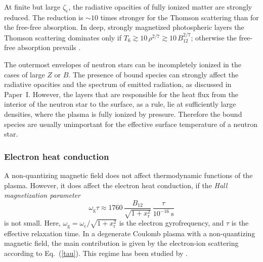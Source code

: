 \documentclass[smallextended]{svjour3}       %
\newcommand{\omc}{\omega_\mathrm{c}}
\newcommand{\omg}{\omega_\mathrm{g}}
\newcommand{\req}[1]{Eq.~(\ref{#1})}
\newcommand{\zete}{\zeta_e}
\begin{document}
At finite but large $\zete$, the radiative opacities of
fully ionized matter are strongly reduced. The reduction is
$\sim10$ times stronger for the Thomson scattering than for
the free-free absorption. In deep, strongly magnetized
photospheric layers the Thomson scattering dominates only if
$T_6\gtrsim10\,\rho^{2/7} \gtrsim 10\,B_{12}^{2/7}$;
otherwise the free-free absorption prevails \citep{PY01}.

The outermost envelopes of neutron stars can be incompletely
ionized in the cases of large $Z$ or $B$. The presence of
bound species can strongly affect the radiative opacities
and the spectrum of emitted radiation, as discussed in
Paper~I. However, the layers that are responsible for the
heat flux from the interior of the neutron star to the
surface, as a rule, lie at sufficiently large densities,
where the plasma is fully ionized by pressure. Therefore the
bound species are usually unimportant for the effective
surface temperature of a neutron star.

\subsubsection{Electron heat conduction}
\label{sect:condmag-e}

A non-quantizing magnetic field does not affect 
thermodynamic functions of the plasma. However,
it does affect the electron heat conduction, if
the \emph{Hall magnetization parameter} 
\begin{equation}
   \omg\tau\approx 1760\,\frac{B_{12}}{\sqrt{1+x_\mathrm{r}^2}}
   \,\frac{\tau}{10^{-16}\mathrm{~s}}
\label{omegatau}
\end{equation}
 is not small.
Here, $\omg=\omc/\sqrt{1+x_\mathrm{r}^2}$ 
is the electron gyrofrequency, and
$\tau$ 
is the effective relaxation
time. In a degenerate Coulomb plasma with a non-quantizing
magnetic field, the main contribution is given by the
electron-ion scattering according to \req{tau}.
This regime has been studied by \citet{YakovlevUrpin80}.
\end{document}
